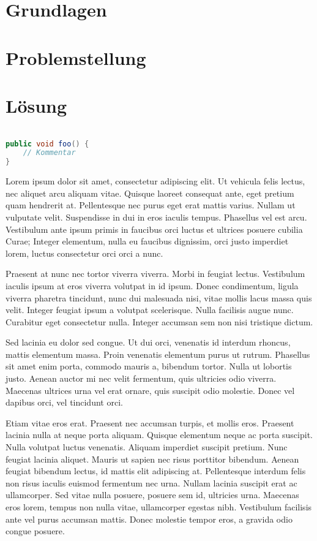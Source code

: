 \documentclass[12pt,twoside,a4paper,parskip]{scrbook}
\begin{document}
\parencite{gamma2011patterns}

\chapter{Grundlagen}

\chapter{Problemstellung}

\chapter{Lösung}

\begin{lstlisting}[label=lst:java,
				   language=java,
				   firstnumber=1,
				   caption=Beispiel für einen Quelltext]

public void foo() {
	// Kommentar
}
\end{lstlisting}

Lorem ipsum dolor sit amet, consectetur adipiscing elit. Ut vehicula felis lectus, nec aliquet arcu aliquam vitae. Quisque laoreet consequat ante, eget pretium quam hendrerit at. Pellentesque nec purus eget erat mattis varius. Nullam ut vulputate velit. Suspendisse in dui in eros iaculis tempus. Phasellus vel est arcu. Vestibulum ante ipsum primis in faucibus orci luctus et ultrices posuere cubilia Curae; Integer elementum, nulla eu faucibus dignissim, orci justo imperdiet lorem, luctus consectetur orci orci a nunc.

Praesent at nunc nec tortor viverra viverra. Morbi in feugiat lectus. Vestibulum iaculis ipsum at eros viverra volutpat in id ipsum. Donec condimentum, ligula viverra pharetra tincidunt, nunc dui malesuada nisi, vitae mollis lacus massa quis velit. Integer feugiat ipsum a volutpat scelerisque. Nulla facilisis augue nunc. Curabitur eget consectetur nulla. Integer accumsan sem non nisi tristique dictum.

Sed lacinia eu dolor sed congue. Ut dui orci, venenatis id interdum rhoncus, mattis elementum massa. Proin venenatis elementum purus ut rutrum. Phasellus sit amet enim porta, commodo mauris a, bibendum tortor. Nulla ut lobortis justo. Aenean auctor mi nec velit fermentum, quis ultricies odio viverra. Maecenas ultrices urna vel erat ornare, quis suscipit odio molestie. Donec vel dapibus orci, vel tincidunt orci.

Etiam vitae eros erat. Praesent nec accumsan turpis, et mollis eros. Praesent lacinia nulla at neque porta aliquam. Quisque elementum neque ac porta suscipit. Nulla volutpat luctus venenatis. Aliquam imperdiet suscipit pretium. Nunc feugiat lacinia aliquet. Mauris ut sapien nec risus porttitor bibendum. Aenean feugiat bibendum lectus, id mattis elit adipiscing at. Pellentesque interdum felis non risus iaculis euismod fermentum nec urna. Nullam lacinia suscipit erat ac ullamcorper. Sed vitae nulla posuere, posuere sem id, ultricies urna. Maecenas eros lorem, tempus non nulla vitae, ullamcorper egestas nibh. Vestibulum facilisis ante vel purus accumsan mattis. Donec molestie tempor eros, a gravida odio congue posuere.
\end{document}
